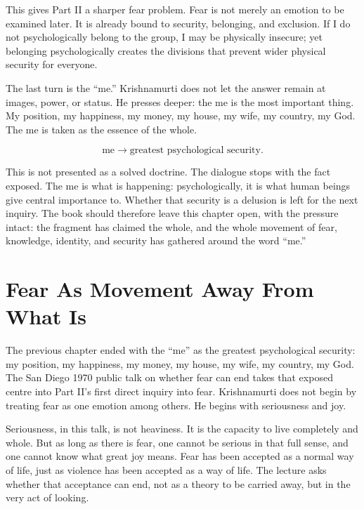 \documentclass[11pt,oneside]{book}
\begin{document}
This gives Part II a sharper fear problem. Fear is not merely an emotion to be examined later. It is already bound to security, belonging, and exclusion. If I do not psychologically belong to the group, I may be physically insecure; yet belonging psychologically creates the divisions that prevent wider physical security for everyone.

The last turn is the ``me.'' Krishnamurti does not let the answer remain at images, power, or status. He presses deeper: the me is the most important thing. My position, my happiness, my money, my house, my wife, my country, my God. The me is taken as the essence of the whole.

\begin{equation}
\text{me}
\longrightarrow
\text{greatest psychological security}.
\end{equation}

This is not presented as a solved doctrine. The dialogue stops with the fact exposed. The me is what is happening: psychologically, it is what human beings give central importance to. Whether that security is a delusion is left for the next inquiry. The book should therefore leave this chapter open, with the pressure intact: the fragment has claimed the whole, and the whole movement of fear, knowledge, identity, and security has gathered around the word ``me.''


\chapter{Fear As Movement Away From What Is}

The previous chapter ended with the ``me'' as the greatest psychological security: my position, my happiness, my money, my house, my wife, my country, my God. The San Diego 1970 public talk on whether fear can end takes that exposed centre into Part II's first direct inquiry into fear. Krishnamurti does not begin by treating fear as one emotion among others. He begins with seriousness and joy.

Seriousness, in this talk, is not heaviness. It is the capacity to live completely and whole. But as long as there is fear, one cannot be serious in that full sense, and one cannot know what great joy means. Fear has been accepted as a normal way of life, just as violence has been accepted as a way of life. The lecture asks whether that acceptance can end, not as a theory to be carried away, but in the very act of looking.
\end{document}
